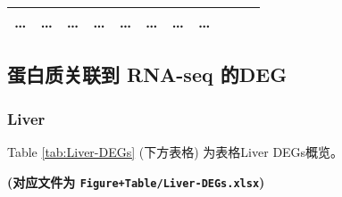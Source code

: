 \documentclass[
]{article}
\begin{document}
\begin{longtable}[]{@{}lllllllllll@{}}
\begin{minipage}[t]{0.09\columnwidth}
\ldots{}\strut
\end{minipage} & \begin{minipage}[t]{0.07\columnwidth}\raggedright
\ldots{}\strut
\end{minipage} & \begin{minipage}[t]{0.07\columnwidth}\raggedright
\ldots{}\strut
\end{minipage} & \begin{minipage}[t]{0.09\columnwidth}\raggedright
\ldots{}\strut
\end{minipage} & \begin{minipage}[t]{0.07\columnwidth}\raggedright
\ldots{}\strut
\end{minipage} & \begin{minipage}[t]{0.07\columnwidth}\raggedright
\ldots{}\strut
\end{minipage} & \begin{minipage}[t]{0.07\columnwidth}\raggedright
\ldots{}\strut
\end{minipage} & \begin{minipage}[t]{0.03\columnwidth}\raggedright
\ldots{}\strut
\end{minipage}\tabularnewline
\bottomrule
\end{longtable}

\hypertarget{ux86cbux767dux8d28ux5173ux8054ux5230-rna-seq-ux7684deg}{%
\subsection{蛋白质关联到 RNA-seq 的DEG}\label{ux86cbux767dux8d28ux5173ux8054ux5230-rna-seq-ux7684deg}}

\hypertarget{liver}{%
\subsubsection{Liver}\label{liver}}

Table \ref{tab:Liver-DEGs} (下方表格) 为表格Liver DEGs概览。

\textbf{(对应文件为 \texttt{Figure+Table/Liver-DEGs.xlsx})}
\end{document}
